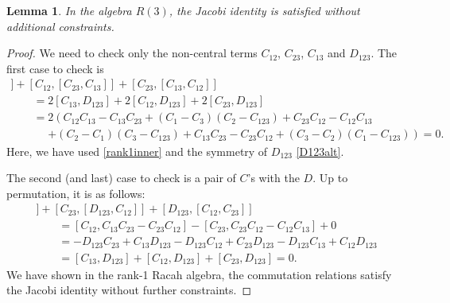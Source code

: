 \documentclass[pdftex]{sigma}
\numberwithin{equation}{section}
\newtheorem{Lemma}[Theorem]{Lemma}
\begin{document}
\begin{Lemma}\label{JacobiRank1}
In the algebra $R(3)$, the Jacobi identity is satisfied without additional constraints.
\end{Lemma}
\begin{proof}
 We need to check only the non-central terms $C_{12}$, $ C_{23}$, $C_{13}$ and $D_{123}$. The first case to check is
\begin{gather*}
[C_{13},[C_{12}, C_{23}]]+ [C_{12},[C_{23}, C_{13}]]+[C_{23},[C_{13}, C_{12}]]\\
\qquad= 2 [C_{13}, D_{123}]+2[C_{12}, D_{123}]+2[C_{23}, D_{123}]\\
\qquad= 2 \left( C_{12}C_{13}-C_{13}C_{23}+(C_1-C_3)(C_2-C_{123}) + C_{23}C_{12}-C_{12}C_{13}\right.\\
\phantom{=}{}\qquad\left.+(C_2-C_1)(C_3-C_{123}) +C_{13}C_{23}-C_{23}C_{12}+(C_3-C_2)(C_1-C_{123})\right) = 0.
\end{gather*}
Here, we have used \eqref{rank1inner} and the symmetry of $D_{123}$ \eqref{D123alt}.

The second (and last) case to check is a pair of $C$'s with the $D$. Up to permutation, it is as follows:
\begin{gather*}
[C_{12},[C_{23}, D_{123}]]+ [C_{23},[D_{123}, C_{12}]]+[D_{123},[C_{12}, C_{23}]]\\
\qquad= [ C_{12},C_{13}C_{23}-C_{23}C_{12}]- [C_{23}, C_{23}C_{12}-C_{12}C_{13}]+0\\
\qquad= -D_{123}C_{23}+C_{13}D_{123}- D_{123} C_{12} +C_{23}D_{123} -D_{123} C_{13}+C_{12}D_{123}  \\
\qquad= [C_{13}, D_{123}]+[C_{12}, D_{123}]+[C_{23}, D_{123}] =0.
\end{gather*}
We have shown in the rank-1 Racah algebra, the commutation relations satisfy the Jacobi identity without further constraints.
\end{proof}
\end{document}
